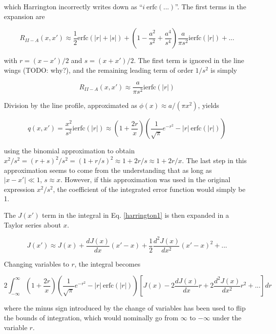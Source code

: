 \documentclass[onecolumn]{aastex63}
\begin{document}
which Harrington incorrectly writes down as ``$i\ \mathrm{erfc(...)}$''. The first terms in the expansion are 


\begin{equation}
    R_{II-A}(x, x') \approx \frac{1}{2}\mathrm{erfc}(|r|+|s|) + \left(1 - \frac{a^2}{s^2} + \frac{a^4}{s^4}\right) \frac{a}{\pi s^2} \mathrm{ierfc}(|r|) + ...
\end{equation}

with $r=(x-x')/2$ and $s=(x+x')/2$. The first term is ignored in the line wings (TODO: why?), and the remaining leading term of order $1/s^2$ is simply

\begin{equation}
    R_{II-A}(x, x') \approx \frac{a}{\pi s^2}\mathrm{ierfc}(|r|)
\end{equation}

Division by the line profile, approximated as $\phi(x) \approx a/(\pi x^2)$, yields

\begin{equation}
    q(x, x') = \frac{x^2}{s^2} \mathrm{ierfc}(|r|) \approx \left(1+\frac{2r}{x}\right)\left(\frac{1}{\sqrt{\pi}}e^{-r^2} - |r|\ \mathrm{erfc}(|r|)\right)
\end{equation}

using the binomial approximation to obtain $x^2/s^2 = (r+s)^2/s^2 = (1+r/s)^2 \approx 1 + 2r/s \approx 1 + 2r/x$. The last step in this approximation seems to come from the understanding that as long as $|x-x'|\ll 1$, $s \approx x$. However, if this approximation was used in the original expression $x^2/s^2$, the coefficient of the integrated error function would simply be 1.

The $J(x')$ term in the integral in Eq. \ref{harrington1} is then expanded in a Taylor series about $x$.

\begin{equation}
    J(x') \approx J(x) + \frac{dJ(x)}{dx}(x' - x) + \frac{1}{2}\frac{d^2J(x)}{dx^2}(x'-x)^2 + ...
\end{equation}

Changing variables to $r$, the integral becomes

\begin{equation}
    2 \int_{-\infty}^{\infty} \left(1+\frac{2r}{x}\right)\left(\frac{1}{\sqrt{\pi}}e^{-r^2} - |r|\ \mathrm{erfc}(|r|)\right)\left[J(x) - 2\frac{dJ(x)}{dx}r + 2\frac{d^2J(x)}{dx^2}r^2 + ...\right] dr
\end{equation}

where the minus sign introduced by the change of variables has been used to flip the bounds of integration, which would nominally go from $\infty$ to $-\infty$ under the variable $r$.
\end{document}
